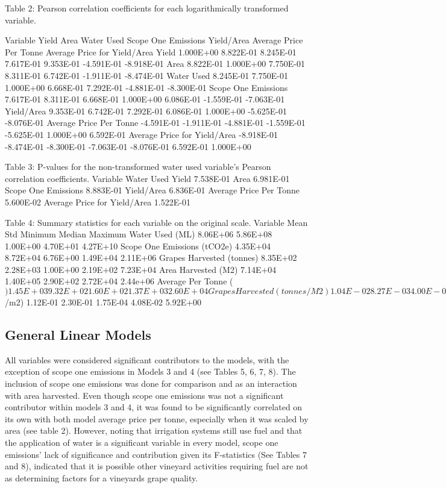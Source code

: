 \documentclass[
  journal=large,
  manuscript=article-type,
  year=2023,
  volume=?,
]{cup-journal}
\begin{document}
Table 2: Pearson correlation coefficients for each logarithmically transformed variable.

Variable
Yield
Area
Water Used
Scope One Emissions
Yield/Area
Average Price Per Tonne
Average Price for Yield/Area
Yield
1.000E+00
8.822E-01
8.245E-01
7.617E-01
9.353E-01
-4.591E-01
-8.918E-01
Area
8.822E-01
1.000E+00
7.750E-01
8.311E-01
6.742E-01
-1.911E-01
-8.474E-01
Water Used
8.245E-01
7.750E-01
1.000E+00
6.668E-01
7.292E-01
-4.881E-01
-8.300E-01
Scope One Emissions
7.617E-01
8.311E-01
6.668E-01
1.000E+00
6.086E-01
-1.559E-01
-7.063E-01
Yield/Area
9.353E-01
6.742E-01
7.292E-01
6.086E-01
1.000E+00
-5.625E-01
-8.076E-01
Average Price Per Tonne
-4.591E-01
-1.911E-01
-4.881E-01
-1.559E-01
-5.625E-01
1.000E+00
6.592E-01
Average Price for Yield/Area
-8.918E-01
-8.474E-01
-8.300E-01
-7.063E-01
-8.076E-01
6.592E-01
1.000E+00

Table 3: P-values for the non-transformed water used variable’s Pearson correlation coefficients.
Variable
Water Used
Yield
7.538E-01
Area
6.981E-01
Scope One Emissions
8.883E-01
Yield/Area
6.836E-01
Average Price Per Tonne
5.600E-02
Average Price for Yield/Area
1.522E-01

Table 4: Summary statistics for each variable on the original scale.
Variable
Mean
Std
Minimum
Median
Maximum
Water Used (ML)
8.06E+06
5.86E+08
1.00E+00
4.70E+01
4.27E+10
Scope One Emissions (tCO2e)
4.35E+04
8.72E+04
6.76E+00
1.49E+04
2.11E+06
Grapes Harvested (tonnes)
8.35E+02
2.28E+03
1.00E+00
2.19E+02
7.23E+04
Area Harvested (M2)
7.14E+04
1.40E+05
2.90E+02
2.72E+04
2.44e+06
Average Per Tonne ($)
1.45E+03
9.32E+02
1.60E+02
1.37E+03
2.60E+04
Grapes Harvested (tonnes/M2)
1.04E-02
8.27E-03
4.00E-05
7.53E-03
8.63E-02
Average Per Tonne ($/m2)
1.12E-01
2.30E-01
1.75E-04
4.08E-02
5.92E+00

\subsection{General Linear Models}
All variables were considered significant contributors to the models, with the exception of scope one emissions in Models 3 and 4 (see Tables 5, 6, 7, 8). The inclusion of scope one emissions was done for comparison and as an interaction with area harvested. Even though scope one emissions was not a significant contributor within models 3 and 4, it was found to be significantly correlated on its own with both model average price per tonne, especially when it was scaled by area (see table 2). However, noting that irrigation systems still use fuel and that the application of water is a significant variable in every model, scope one emissions’ lack of significance and contribution given its F-statistics (See Tables 7 and 8), indicated that it is possible other vineyard activities requiring fuel are not as determining factors for a vineyards grape quality.
\end{document}
